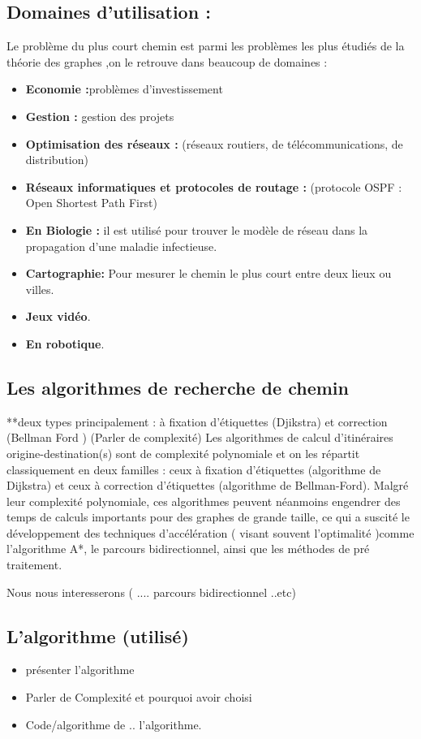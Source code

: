 \subsection{Domaines d'utilisation :}
Le problème du plus court chemin est parmi les problèmes les plus étudiés de la théorie des graphes ,on le retrouve dans beaucoup de domaines :
\begin{itemize}
\item\textbf{Economie :}problèmes d’investissement
\item\textbf{Gestion :} gestion des projets
\item\textbf{Optimisation des réseaux :} (réseaux routiers, de télécommunications, de distribution)
\item\textbf{Réseaux informatiques et protocoles de routage :} (protocole OSPF : Open Shortest Path First) 
\item\textbf{En Biologie :} il est utilisé pour trouver le modèle de réseau dans la propagation d'une maladie infectieuse.
\item\textbf{Cartographie:} Pour mesurer le chemin le plus court entre deux lieux ou villes.
\item\textbf{Jeux vidéo}.
\item\textbf{En robotique}.
\end{itemize}

\subsection{Les algorithmes de recherche de chemin}
**deux types principalement : à fixation d'étiquettes (Djikstra) et correction  (Bellman Ford ) \newline
(Parler de complexité) \newline
Les algorithmes de calcul d'itinéraires origine-destination(s) sont de complexité polynomiale et on les répartit classiquement en deux familles : ceux à fixation d'étiquettes (algorithme de Dijkstra) et ceux à correction d'étiquettes (algorithme de Bellman-Ford).
Malgré leur complexité polynomiale, ces algorithmes peuvent néanmoins engendrer des temps de calculs importants pour des graphes de grande taille, ce qui a suscité le développement des techniques d'accélération (  visant souvent l'optimalité )comme l'algorithme A*, le parcours bidirectionnel, ainsi que les méthodes de pré traitement.

Nous nous interesserons ( .... parcours bidirectionnel ..etc) 

\subsection{L'algorithme (utilisé)}
\begin{itemize}
\item présenter l'algorithme
\item Parler de Complexité et pourquoi avoir choisi
\item Code/algorithme de .. l'algorithme.
\end{itemize}


